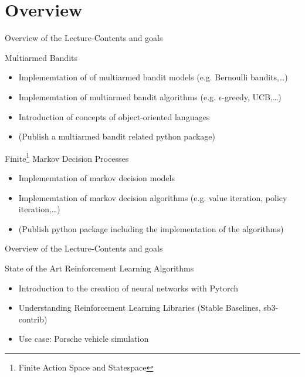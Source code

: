 \section{Overview}

\begin{frame}{Overview of the Lecture-Contents and goals}
    \begin{content}
        Multiarmed Bandits
        \begin{itemize}
            \item Implememtation of of multiarmed bandit models (e.g. Bernoulli bandits,\dots)
            \item Implememtation of multiarmed bandit algorithms (e.g. $\epsilon$-greedy, UCB,\dots)
            \item Introduction of concepts of object-oriented languages
            \item (Publish a multiarmed bandit related python package)
        \end{itemize}
    \end{content}
    \begin{content}
        Finite\footnote{Finite Action Space and Statespace} Markov Decision Processes
        \begin{itemize}
            \item  Implememtation of markov decision models
            \item Implememtation of markov decision algorithms (e.g. value iteration, policy iteration,\dots)
            \item (Publish python package including the implementation of the algorithms)
        \end{itemize}
    \end{content}
\end{frame}
\begin{frame}{Overview of the Lecture-Contents and goals}
    \begin{content}
        State of the Art Reinforcement Learning Algorithms
        \begin{itemize}
            \item Introduction to the creation of neural networks with Pytorch
            \item Understanding Reinforcement Learning Libraries (Stable Baselines, sb3-contrib)
            \item Use case: Porsche vehicle simulation
        \end{itemize}
    \end{content}
\end{frame}